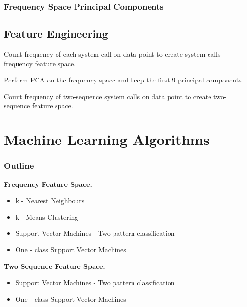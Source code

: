 \documentclass{beamer}
\begin{document}
\frame
{
\frametitle{Frequency Space Principal Components}
\begin{figure}
\end{figure}
}

\subsection{Feature Engineering}

\frame
{
\itemize
{
\item Count frequency of each system call on data point to create system calls frequency feature space.
\item Perform PCA on the frequency space and keep the first 9 principal components.
\item Count frequency of two-sequence system calls on data point  to create two-sequence feature space.
}
}


\section{Machine Learning Algorithms}
\frame
{
\frametitle{Outline}
\textbf{Frequency Feature Space:}
\begin{itemize}
\item k - Nearest Neighbours\cite{adf1}
\item k - Means Clustering\cite{adf1}
\item Support Vector Machines - Two pattern classification
\item One - class Support Vector Machines
\end{itemize}
\textbf{Two Sequence Feature Space:}
\begin{itemize}
\item Support Vector Machines - Two pattern classification
\item One - class Support Vector Machines
\end{itemize}
}
\end{document}
